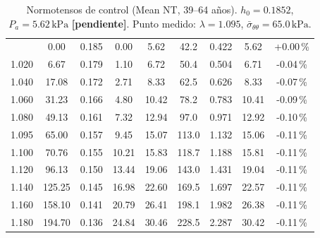 \documentclass[11pt]{article}
\newcommand{\kPa}{\,\mathrm{kPa}}
\newcommand{\sbar}{\bar\sigma_{\theta\theta}}
\newcommand{\pend}{\textcolor{red!70!black}{\textbf{[pendiente]}}}
\begin{document}
\begin{table}[H]\centering\footnotesize\setlength{\tabcolsep}{3pt}
\caption{Normotensos de control (Mean NT, 39--64 años). $h_0=0.1852$, $P_a=5.62\kPa$ \pend. Punto medido: $\lambda=1.095$, $\sbar=65.0\kPa$.}
\begin{tabular}{ccccccccc}\toprule\tablehead1.000 & 0.00 & 0.185 & 0.00 & 5.62 & 42.2 & 0.422 & 5.62 & +0.00\,\% \\
1.020 & 6.67 & 0.179 & 1.10 & 6.72 & 50.4 & 0.504 & 6.71 & -0.04\,\% \\
1.040 & 17.08 & 0.172 & 2.71 & 8.33 & 62.5 & 0.626 & 8.33 & -0.07\,\% \\
1.060 & 31.23 & 0.166 & 4.80 & 10.42 & 78.2 & 0.783 & 10.41 & -0.09\,\% \\
1.080 & 49.13 & 0.161 & 7.32 & 12.94 & 97.0 & 0.971 & 12.92 & -0.10\,\% \\
1.095 & 65.00 & 0.157 & 9.45 & 15.07 & 113.0 & 1.132 & 15.06 & -0.11\,\% \\
1.100 & 70.76 & 0.155 & 10.21 & 15.83 & 118.7 & 1.188 & 15.81 & -0.11\,\% \\
1.120 & 96.13 & 0.150 & 13.44 & 19.06 & 143.0 & 1.431 & 19.04 & -0.11\,\% \\
1.140 & 125.25 & 0.145 & 16.98 & 22.60 & 169.5 & 1.697 & 22.57 & -0.11\,\% \\
1.160 & 158.10 & 0.141 & 20.79 & 26.41 & 198.1 & 1.982 & 26.38 & -0.11\,\% \\
1.180 & 194.70 & 0.136 & 24.84 & 30.46 & 228.5 & 2.287 & 30.42 & -0.11\,\% \\
\bottomrule\end{tabular}\end{table}
\end{document}
